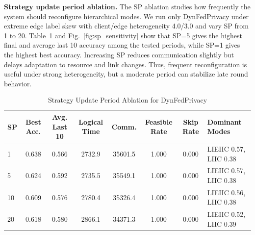 ﻿\documentclass[preprint,12pt]{elsarticle}
\theoremstyle{plain}
\theoremstyle{definition}
\theoremstyle{remark}
\newcommand{\tabref}[1]{Table~\ref{#1}}
\newcommand{\figref}[1]{Fig.~\ref{#1}}
\newcommand{\method}{DynFedPrivacy}
\begin{document}
\textbf{Strategy update period ablation.}
The SP ablation studies how frequently the system should reconfigure hierarchical modes.
We run only \method{} under extreme edge label skew with client/edge heterogeneity 4.0/3.0 and vary SP from 1 to 20.
\tabref{tab:sp_sensitivity} and \figref{fig:sp_sensitivity} show that SP=5 gives the highest final and average last 10 accuracy among the tested periods, while SP=1 gives the highest best accuracy.
Increasing SP reduces communication slightly but delays adaptation to resource and link changes.
Thus, frequent reconfiguration is useful under strong heterogeneity, but a moderate period can stabilize late round behavior.

\begin{table}[t]
\centering
\caption{Strategy Update Period Ablation for \method}
\label{tab:sp_sensitivity}
\begin{tabular}{lccccccl}
\hline
\textbf{SP} & \textbf{Best Acc.} & \textbf{Avg. Last 10} & \textbf{Logical Time} & \textbf{Comm.} & \textbf{Feasible Rate} & \textbf{Skip Rate} & \textbf{Dominant Modes} \\
\hline
1 & 0.638 & 0.566 & 2732.9 & 35601.5 & 1.000 & 0.000 & LIEIIC 0.57, LIIC 0.38 \\
5 & 0.624 & 0.592 & 2735.5 & 35549.1 & 1.000 & 0.000 & LIEIIC 0.57, LIIC 0.38 \\
10 & 0.609 & 0.576 & 2780.4 & 35326.4 & 1.000 & 0.000 & LIEIIC 0.56, LIIC 0.38 \\
20 & 0.618 & 0.580 & 2866.1 & 34371.3 & 1.000 & 0.000 & LIEIIC 0.52, LIIC 0.39 \\
\hline
\end{tabular}
\end{table}
\end{document}

